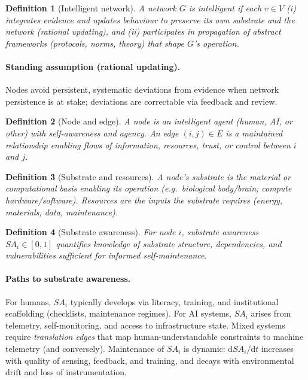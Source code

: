 \documentclass[12pt]{article}
\newtheorem{definition}{Definition}
\begin{document}
\begin{definition}[Intelligent network]\label{def:intnet}
A network $G$ is \emph{intelligent} if each $v\in V$ (i) integrates evidence and updates behaviour to preserve its own substrate and the network (rational updating), and (ii) participates in propagation of abstract frameworks (protocols, norms, theory) that shape $G$'s operation.

\end{definition}

\paragraph{Standing assumption (rational updating).} Nodes avoid persistent, systematic deviations from evidence when network persistence is at stake; deviations are correctable via feedback and review.

\begin{definition}[Node and edge]
A \emph{node} is an intelligent agent (human, AI, or other) with self-awareness and agency. An \emph{edge} $(i,j)\in E$ is a maintained relationship enabling flows of information, resources, trust, or control between $i$ and $j$.

\end{definition}

\begin{definition}[Substrate and resources]
A node’s \emph{substrate} is the material or computational basis enabling its operation (e.g.\ biological body/brain; compute hardware/software). \emph{Resources} are the inputs the substrate requires (energy, materials, data, maintenance).

\end{definition}

\begin{definition}[Substrate awareness] For node $i$, \emph{substrate awareness} $SA_i\in[0,1]$ quantifies knowledge of substrate structure, dependencies, and vulnerabilities sufficient for informed self-maintenance.

\end{definition}

\paragraph{Paths to substrate awareness.}
For humans, $SA_i$ typically develops via literacy, training, and institutional scaffolding (checklists, maintenance regimes). For AI systems, $SA_i$ arises from telemetry, self-monitoring, and access to infrastructure state. Mixed systems require \emph{translation edges} that map human-understandable constraints to machine telemetry (and conversely). Maintenance of $SA_i$ is dynamic: $\mathrm{d}SA_i/\mathrm{d}t$ increases with quality of sensing, feedback, and training, and decays with environmental drift and loss of instrumentation.
\end{document}
